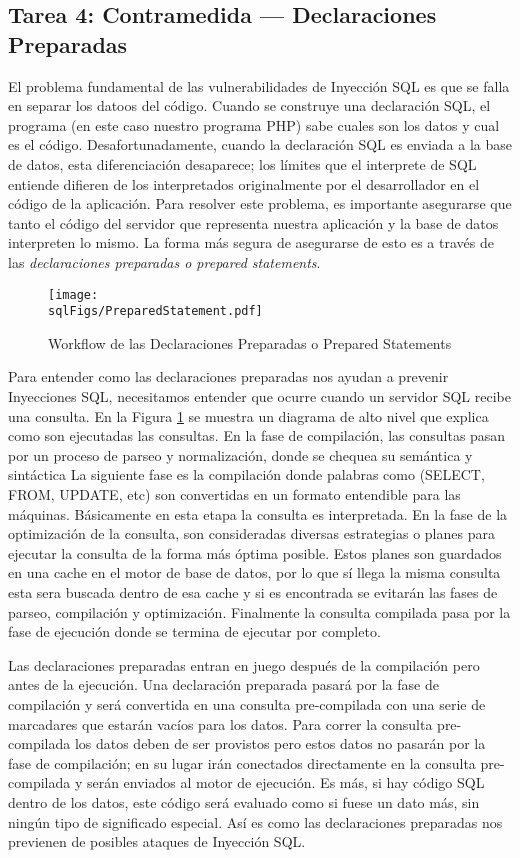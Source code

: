 \subsection{Tarea 4: Contramedida --- Declaraciones Preparadas} 

El problema fundamental de las vulnerabilidades de Inyección SQL es que se falla en separar los datoos del código. Cuando se construye una declaración SQL, el programa (en este caso nuestro programa PHP) sabe cuales son los datos y cual es el código. 
Desafortunadamente, cuando la declaración SQL es enviada a la base de datos, esta diferenciación desaparece; los límites que el interprete de SQL entiende difieren de los interpretados originalmente por el desarrollador en el código de la aplicación.
Para resolver este problema, es importante asegurarse que tanto el código del servidor que representa nuestra aplicación y la base de datos interpreten lo mismo. La forma más segura de asegurarse de esto es a través de las \textit{declaraciones preparadas o prepared statements}. 

\begin{figure}
\centering
\texttt{[image: \\sqlFigs/PreparedStatement.pdf]}
\caption{Workflow de las Declaraciones Preparadas o Prepared Statements}
\label{sql:fig:preparedstatement}
\end{figure}

Para entender como las declaraciones preparadas nos ayudan a prevenir Inyecciones SQL, necesitamos entender que ocurre cuando un servidor SQL recibe una consulta.
En la Figura \ref{sql:fig:preparedstatement} se muestra un diagrama de alto nivel que explica como son ejecutadas las consultas.
En la fase de compilación, las consultas pasan por un proceso de parseo y normalización, donde se chequea su semántica y sintáctica
La siguiente fase es la compilación donde palabras como (SELECT, FROM, UPDATE, etc) son convertidas en un formato entendible para las máquinas. Básicamente en esta etapa la consulta es interpretada.
En la fase de la optimización de la consulta, son consideradas diversas estrategias o planes para ejecutar la consulta de la forma más óptima posible. Estos planes son guardados en una cache en el motor de base de datos, por lo que sí llega la misma consulta esta sera buscada dentro de esa cache y si es encontrada se evitarán las fases de parseo, compilación y optimización. Finalmente la consulta compilada pasa por la fase de ejecución donde se termina de ejecutar por completo.

Las declaraciones preparadas entran en juego después de la compilación pero antes de la ejecución.
Una declaración preparada pasará por la fase de compilación y será convertida en una consulta pre-compilada con una serie de marcadares que estarán vacíos para los datos. Para correr la consulta pre-compilada los datos deben de ser provistos pero estos datos no pasarán por la fase de compilación; en su lugar irán conectados directamente en la consulta pre-compilada y serán enviados al motor de ejecución.
Es más, si hay código SQL dentro de los datos, este código será evaluado como si fuese un dato más, sin ningún tipo de significado especial.
Así es como las declaraciones preparadas nos previenen de posibles ataques de Inyección SQL.


